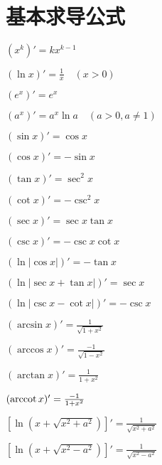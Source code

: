 \section{基本求导公式}

\begin{multicols}{2}
    \begin{spacing}{\hangju}
        \noindent $(x^k)' = kx^{k-1}$

        \noindent $(\ln x)' = \frac{1}{x} \quad (x > 0)$

        \noindent $(e^x)' = e^x$

        \noindent $(a^x)' = a^x\ln{a} \quad (a > 0, a \neq 1)$

        \noindent $(\sin{x})' = \cos{x}$

        \noindent $(\cos{x})' = -\sin{x}$

        \noindent $(\tan{x})' = \sec^2{x}$

        \noindent $(\cot{x})' = -\csc^2{x}$

        \noindent $(\sec{x})' = \sec{x}\tan{x}$

        \noindent $(\csc{x})' = -\csc{x}\cot{x}$

        \noindent $(\ln{\left| \cos{x} \right|})' = -\tan{x}$

        \noindent $(\ln{\left| \sec{x} + \tan{x} \right|})' = \sec{x}$

        \noindent $(\ln{\left| \csc{x} - \cot{x} \right|})' = -\csc{x}$

        \noindent $(\arcsin{x})' = \frac{1}{\sqrt{1 + x^2}}$

        \noindent $(\arccos{x})' = \frac{-1}{\sqrt{1 - x^2}}$

        \noindent $(\arctan{x})' = \frac{1}{1 + x^2}$

        \noindent $( \operatorname{arccot}{x})' = \frac{-1}{1 + x^2}$

        \noindent $[\ln{(x + \sqrt{x^2 + a^2})}]' = \frac{1}{\sqrt{x^2 + a^2}}$

        \noindent $[\ln{(x + \sqrt{x^2 - a^2})}]' = \frac{1}{\sqrt{x^2 - a^2}}$
    \end{spacing}
\end{multicols}

